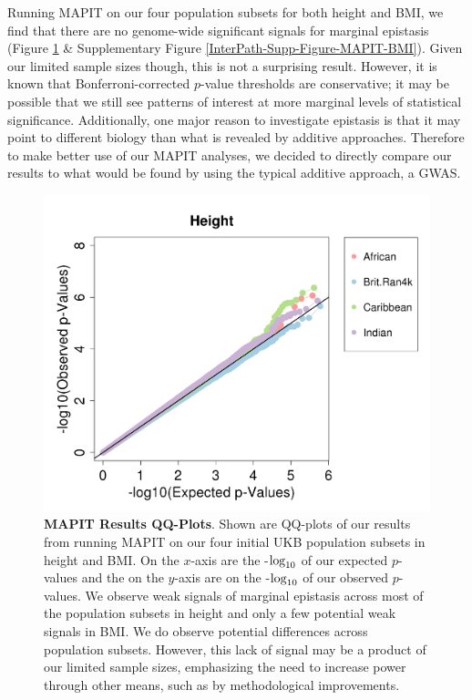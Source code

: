 \documentclass[12pt, a4paper]{article}
\def\log{{\rm log}}
\begin{document}
Running MAPIT on our four population subsets for both height and BMI, we find that there are no genome-wide significant signals for marginal epistasis (Figure \ref{InterPath-Main-Figure-MAPIT-Height} \& Supplementary Figure \ref{InterPath-Supp-Figure-MAPIT-BMI}). Given our limited sample sizes though, this is not a surprising result. However, it is known that Bonferroni-corrected $p$-value thresholds are conservative; it may be possible that we still see patterns of interest at more marginal levels of statistical significance. Additionally, one major reason to investigate epistasis is that it may point to different biology than what is revealed by additive approaches. Therefore to make better use of our MAPIT analyses, we decided to directly compare our results to what would be found by using the typical additive approach, a GWAS. 

\begin{figure}[htbp]
\centering
\includegraphics[scale=.35]{Images/Main/InterPath_Main_Figure_MAPIT_vs3_Height.png}
\caption[TBD]{\textbf{MAPIT Results QQ-Plots}. Shown are QQ-plots of our results from running MAPIT on our four initial UKB population subsets in height and BMI. On the $x$-axis are the -$\log_{10}$ of our expected $p$-values and the on the $y$-axis are on the -$\log_{10}$ of our observed $p$-values. We observe weak signals of marginal epistasis across most of the population subsets in height and only a few potential weak signals in BMI. We do observe potential differences across population subsets. However, this lack of signal may be a product of our limited sample sizes, emphasizing the need to increase power through other means, such as by methodological improvements.}
\label{InterPath-Main-Figure-MAPIT-Height}
\end{figure}
\end{document}
